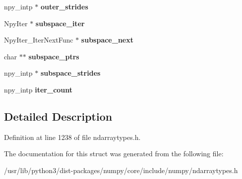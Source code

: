 \begin{DoxyCompactItemize}
\item 
npy\+\_\+intp $\ast$ {\bfseries outer\+\_\+strides}\hypertarget{structPyArrayMapIterObject_aa533cf30fb8128133308e88329d5eeee}{}\label{structPyArrayMapIterObject_aa533cf30fb8128133308e88329d5eeee}

\item 
Npy\+Iter $\ast$ {\bfseries subspace\+\_\+iter}\hypertarget{structPyArrayMapIterObject_a7cbce352459fcd428e42120b67fb036f}{}\label{structPyArrayMapIterObject_a7cbce352459fcd428e42120b67fb036f}

\item 
Npy\+Iter\+\_\+\+Iter\+Next\+Func $\ast$ {\bfseries subspace\+\_\+next}\hypertarget{structPyArrayMapIterObject_a1d775dd449840b9a414844a744f7cdb9}{}\label{structPyArrayMapIterObject_a1d775dd449840b9a414844a744f7cdb9}

\item 
char $\ast$$\ast$ {\bfseries subspace\+\_\+ptrs}\hypertarget{structPyArrayMapIterObject_a78653c1f942af1c5ba476aeb103e8f62}{}\label{structPyArrayMapIterObject_a78653c1f942af1c5ba476aeb103e8f62}

\item 
npy\+\_\+intp $\ast$ {\bfseries subspace\+\_\+strides}\hypertarget{structPyArrayMapIterObject_a652a051c7802181349ab8b68bf03b224}{}\label{structPyArrayMapIterObject_a652a051c7802181349ab8b68bf03b224}

\item 
npy\+\_\+intp {\bfseries iter\+\_\+count}\hypertarget{structPyArrayMapIterObject_a090e1f8d291398a5c833bc4b0f567580}{}\label{structPyArrayMapIterObject_a090e1f8d291398a5c833bc4b0f567580}

\end{DoxyCompactItemize}


\subsection{Detailed Description}


Definition at line 1238 of file ndarraytypes.\+h.



The documentation for this struct was generated from the following file\+:\begin{DoxyCompactItemize}
\item 
/usr/lib/python3/dist-\/packages/numpy/core/include/numpy/ndarraytypes.\+h\end{DoxyCompactItemize}
